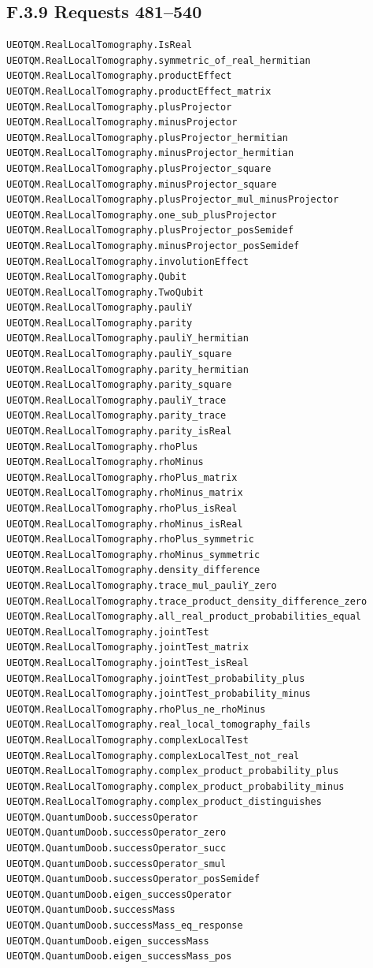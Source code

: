 \documentclass[
  11pt,
  oneside]{book}
\begin{document}
\subsection{F.3.9 Requests 481--540}

\begin{Verbatim}[breaklines,breakanywhere,fontsize=\scriptsize]
UEOTQM.RealLocalTomography.IsReal
UEOTQM.RealLocalTomography.symmetric_of_real_hermitian
UEOTQM.RealLocalTomography.productEffect
UEOTQM.RealLocalTomography.productEffect_matrix
UEOTQM.RealLocalTomography.plusProjector
UEOTQM.RealLocalTomography.minusProjector
UEOTQM.RealLocalTomography.plusProjector_hermitian
UEOTQM.RealLocalTomography.minusProjector_hermitian
UEOTQM.RealLocalTomography.plusProjector_square
UEOTQM.RealLocalTomography.minusProjector_square
UEOTQM.RealLocalTomography.plusProjector_mul_minusProjector
UEOTQM.RealLocalTomography.one_sub_plusProjector
UEOTQM.RealLocalTomography.plusProjector_posSemidef
UEOTQM.RealLocalTomography.minusProjector_posSemidef
UEOTQM.RealLocalTomography.involutionEffect
UEOTQM.RealLocalTomography.Qubit
UEOTQM.RealLocalTomography.TwoQubit
UEOTQM.RealLocalTomography.pauliY
UEOTQM.RealLocalTomography.parity
UEOTQM.RealLocalTomography.pauliY_hermitian
UEOTQM.RealLocalTomography.pauliY_square
UEOTQM.RealLocalTomography.parity_hermitian
UEOTQM.RealLocalTomography.parity_square
UEOTQM.RealLocalTomography.pauliY_trace
UEOTQM.RealLocalTomography.parity_trace
UEOTQM.RealLocalTomography.parity_isReal
UEOTQM.RealLocalTomography.rhoPlus
UEOTQM.RealLocalTomography.rhoMinus
UEOTQM.RealLocalTomography.rhoPlus_matrix
UEOTQM.RealLocalTomography.rhoMinus_matrix
UEOTQM.RealLocalTomography.rhoPlus_isReal
UEOTQM.RealLocalTomography.rhoMinus_isReal
UEOTQM.RealLocalTomography.rhoPlus_symmetric
UEOTQM.RealLocalTomography.rhoMinus_symmetric
UEOTQM.RealLocalTomography.density_difference
UEOTQM.RealLocalTomography.trace_mul_pauliY_zero
UEOTQM.RealLocalTomography.trace_product_density_difference_zero
UEOTQM.RealLocalTomography.all_real_product_probabilities_equal
UEOTQM.RealLocalTomography.jointTest
UEOTQM.RealLocalTomography.jointTest_matrix
UEOTQM.RealLocalTomography.jointTest_isReal
UEOTQM.RealLocalTomography.jointTest_probability_plus
UEOTQM.RealLocalTomography.jointTest_probability_minus
UEOTQM.RealLocalTomography.rhoPlus_ne_rhoMinus
UEOTQM.RealLocalTomography.real_local_tomography_fails
UEOTQM.RealLocalTomography.complexLocalTest
UEOTQM.RealLocalTomography.complexLocalTest_not_real
UEOTQM.RealLocalTomography.complex_product_probability_plus
UEOTQM.RealLocalTomography.complex_product_probability_minus
UEOTQM.RealLocalTomography.complex_product_distinguishes
UEOTQM.QuantumDoob.successOperator
UEOTQM.QuantumDoob.successOperator_zero
UEOTQM.QuantumDoob.successOperator_succ
UEOTQM.QuantumDoob.successOperator_smul
UEOTQM.QuantumDoob.successOperator_posSemidef
UEOTQM.QuantumDoob.eigen_successOperator
UEOTQM.QuantumDoob.successMass
UEOTQM.QuantumDoob.successMass_eq_response
UEOTQM.QuantumDoob.eigen_successMass
UEOTQM.QuantumDoob.eigen_successMass_pos
\end{Verbatim}
\end{document}
